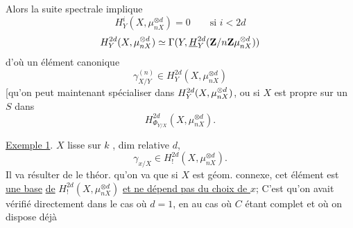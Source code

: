 Alors la suite spectrale implique
\[
H^i_Y(X,\mu_{nX}^{\otimes d})=0\qquad\text{si }i<2d
\]
\[
H^{2d}_Y(X,\mu_{nX}^{\otimes d})\simeq\Gamma(Y,\underline H^{2d}_Y(\relax{\relax{\mathbf Z/n\mathbf Z}}\mu_{nX}^{\otimes d}))
\]
d'où un  élément canonique
\[
\gamma_{X/Y}^{(n)}\in H^{2d}_Y(X,\mu_{nX}^{\otimes d})
\]
[qu'on peut maintenant spécialiser dans $H^{2d}_{\relax{\relax{Y}}}(X,\mu_{nX}^{\otimes d})$, ou si $X$ est propre sur un $S$ dans
\[
H^{2d}_{\Phi_{Y/X}}(X,\mu_{nX}^{\otimes d}).
\]


\uline{Exemple 1}. $X$ lisse sur $k$ ,  dim relative $d$,  
\[
\gamma_{x/X}\in H^{2d}_!(X,\mu_{nX}^{\otimes d}).
\]
Il va résulter de le théor. qu'on va  que  si $X$ est géom. connexe, cet élément est \uline{une base} \uline{de} $H^{2d}_!(X,\mu_{nX}^{\otimes d})$ \uline{et ne dépend pas du choix de $x$};  C'est qu'on avait vérifié directement dans le cas où $d=1$, en   au cas où $C$ étant complet et où on dispose déjà
